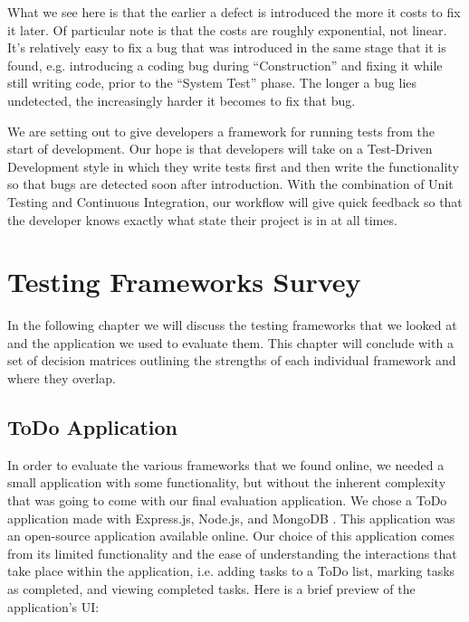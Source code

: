 \documentclass[12pt]{ucthesis}
\begin{document}
What we see here is that the earlier a defect is introduced the more it costs to fix it later. Of particular note is that the costs are roughly exponential, not linear. It's relatively easy to fix a bug that was introduced in the same stage that it is found, e.g. introducing a coding bug during ``Construction'' and fixing it while still writing code, prior to the ``System Test'' phase. The longer a bug lies undetected, the increasingly harder it becomes to fix that bug. 

We are setting out to give developers a framework for running tests from the start of development. Our hope is that developers will take on a Test-Driven Development style in which they write tests first and then write the functionality so that bugs are detected soon after introduction. With the combination of Unit Testing and Continuous Integration, our workflow will give quick feedback so that the developer knows exactly what state their project is in at all times.

\chapter{Testing Frameworks Survey}
In the following chapter we will discuss the testing frameworks that we looked at and the application we used to evaluate them. This chapter will conclude with a set of decision matrices outlining the strengths of each individual framework and where they overlap.

\section{ToDo Application}
In order to evaluate the various frameworks that we found online, we needed a small application with some functionality, but without the inherent complexity that was going to come with our final evaluation application. We chose a ToDo application made with Express.js, Node.js, and MongoDB \cite{ToDoAppHomePage}. This application was an open-source application available online. Our choice of this application comes from its limited functionality and the ease of understanding the interactions that take place within the application, i.e. adding tasks to a ToDo list, marking tasks as completed, and viewing completed tasks. Here is a brief preview of the application's UI:
\end{document}

